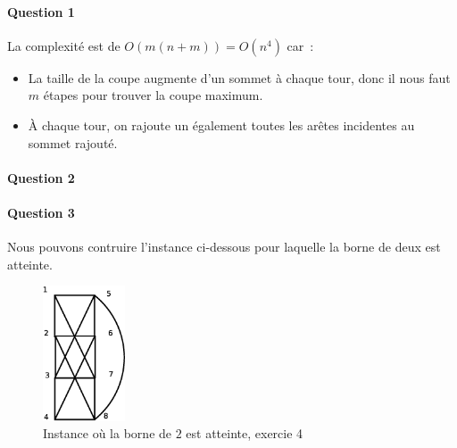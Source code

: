 \paragraph{Question 1}
La complexité est de $O(m(n+m))=O(n^4)$ car~:
\begin{itemize}
\item La taille de la coupe augmente d'un sommet à chaque tour, donc
il nous faut $m$ étapes pour trouver la coupe maximum.
\item À chaque tour, on rajoute un également toutes les arêtes
incidentes au sommet rajouté.
\end{itemize}

\paragraph{Question 2}

\paragraph{Question 3}

Nous pouvons contruire l'instance ci-dessous pour laquelle la borne de
deux est atteinte. 

\begin{figure}[h!]
\centering
\includegraphics[height = 4cm]{exo4.eps}
\caption{Instance où la borne de $2$ est atteinte, exercie 4}
\end{figure}
